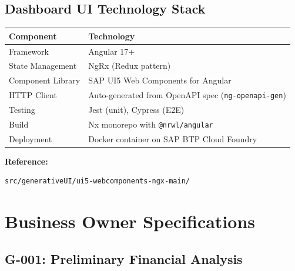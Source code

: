 \subsection{Dashboard UI Technology Stack}
\label{sec:ui-stack}

\begin{tabular}{ll}
\toprule
\textbf{Component} & \textbf{Technology} \\
\midrule
Framework & Angular 17+ \\
State Management & NgRx (Redux pattern) \\
Component Library & SAP UI5 Web Components for Angular \\
HTTP Client & Auto-generated from OpenAPI spec (\texttt{ng-openapi-gen}) \\
Testing & Jest (unit), Cypress (E2E) \\
Build & Nx monorepo with \texttt{@nrwl/angular} \\
Deployment & Docker container on SAP BTP Cloud Foundry \\
\bottomrule
\end{tabular}

\textbf{Reference:}
\begin{verbatim}
src/generativeUI/ui5-webcomponents-ngx-main/
\end{verbatim}

\section{Business Owner Specifications}
\label{sec:business-specs}

\subsection{G-001: Preliminary Financial Analysis}
\label{sec:g001-financial}

